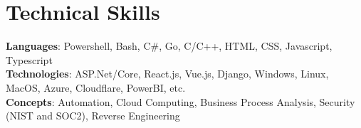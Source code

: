 \section{Technical Skills}
    \begin{itemize}[leftmargin=0.15in, label={}]
	\small{\item{
		\textbf{Languages}{: Powershell, Bash, C\#, Go, C/C++, HTML, CSS, Javascript, Typescript} \\
		\textbf{Technologies}{: ASP.Net/Core, React.js, Vue.js, Django, Windows, Linux, MacOS, Azure, Cloudflare, PowerBI, etc.} \\
		\textbf{Concepts}{: Automation, Cloud Computing, Business Process Analysis, Security (NIST and SOC2), Reverse Engineering}
	}}
    \end{itemize}
